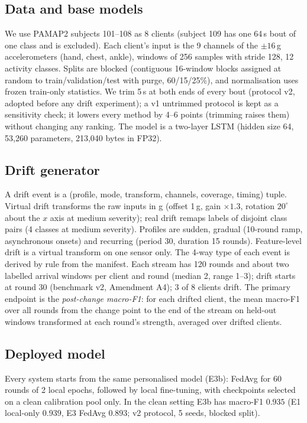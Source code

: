 \documentclass[journal]{IEEEtran}
\begin{document}
\subsection{Data and base models}
We use PAMAP2 subjects 101--108 as 8 clients (subject 109 has one 64\,s bout of one class and is excluded). Each client's input is the 9 channels of the $\pm16$\,g accelerometers (hand, chest, ankle), windows of 256 samples with stride 128, 12 activity classes. Splits are blocked (contiguous 16-window blocks assigned at random to train/validation/test with purge, 60/15/25\%), and normalisation uses frozen train-only statistics. We trim 5\,s at both ends of every bout (protocol v2, adopted before any drift experiment); a v1 untrimmed protocol is kept as a sensitivity check; it lowers every method by 4--6 points (trimming raises them) without changing any ranking. The model is a two-layer LSTM (hidden size 64, 53{,}260 parameters, 213{,}040 bytes in FP32).

\subsection{Drift generator}
A drift event is a (profile, mode, transform, channels, coverage, timing) tuple. Virtual drift transforms the raw inputs in g (offset 1\,g, gain $\times1.3$, rotation $20^\circ$ about the $x$ axis at medium severity); real drift remaps labels of disjoint class pairs (4 classes at medium severity). Profiles are sudden, gradual (10-round ramp, asynchronous onsets) and recurring (period 30, duration 15 rounds). Feature-level drift is a virtual transform on one sensor only. The 4-way type of each event is derived by rule from the manifest. Each stream has 120 rounds and about two labelled arrival windows per client and round (median 2, range 1--3); drift starts at round 30 (benchmark v2, Amendment A4); 3 of 8 clients drift. The primary endpoint is the \emph{post-change macro-F1}: for each drifted client, the mean macro-F1 over all rounds from the change point to the end of the stream on held-out windows transformed at each round's strength, averaged over drifted clients.

\subsection{Deployed model}
Every system starts from the same personalised model (E3b): FedAvg for 60 rounds of 2 local epochs, followed by local fine-tuning, with checkpoints selected on a clean calibration pool only. In the clean setting E3b has macro-F1 $0.935$ (E1 local-only $0.939$, E3 FedAvg $0.893$; v2 protocol, 5 seeds, blocked split).
\end{document}
